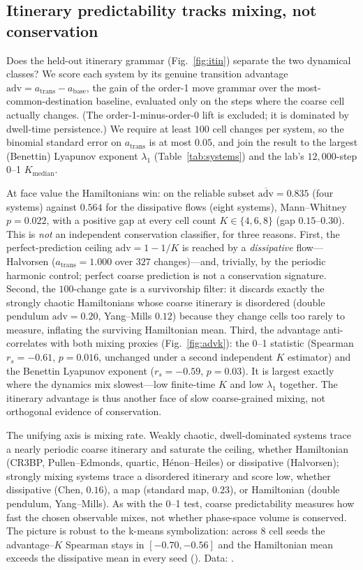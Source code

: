 \documentclass[aip,cha,preprint,amsmath,amssymb,floatfix]{revtex4-2}
\begin{document}
\subsection{Itinerary predictability tracks mixing, not conservation}
\label{sec:itin-adv}

Does the held-out itinerary grammar (Fig.~\ref{fig:itin}) separate the two
dynamical classes? We score each system by its genuine transition advantage
$\mathrm{adv}=a_{\mathrm{trans}}-a_{\mathrm{base}}$, the gain of the order-1 move
grammar over the most-common-destination baseline, evaluated only on the steps
where the coarse cell actually changes. (The order-1-minus-order-0 lift is
excluded; it is dominated by dwell-time persistence.) We require at least $100$
cell changes per system, so the binomial standard error on $a_{\mathrm{trans}}$
is at most $0.05$, and join the result to the largest (Benettin) Lyapunov
exponent $\lambda_1$ (Table~\ref{tab:systems}) and the lab's $12{,}000$-step
0--1 $K_{\mathrm{median}}$.

At face value the Hamiltonians win: on the reliable subset
$\overline{\mathrm{adv}}=0.835$ (four systems) against $0.564$ for the
dissipative flows (eight systems), Mann--Whitney $p=0.022$, with a positive gap
at every cell count $K\in\{4,6,8\}$ (gap $0.15$--$0.30$). This is \emph{not} an
independent conservation classifier, for three reasons. First, the
perfect-prediction ceiling $\mathrm{adv}=1-1/K$ is reached by a \emph{dissipative}
flow---Halvorsen ($a_{\mathrm{trans}}=1.000$ over $327$ changes)---and, trivially,
by the periodic harmonic control; perfect coarse prediction is not a conservation
signature. Second, the $100$-change gate is a survivorship filter: it discards
exactly the strongly chaotic Hamiltonians whose coarse itinerary is disordered
(double pendulum $\mathrm{adv}=0.20$, Yang--Mills $0.12$) because they change
cells too rarely to measure, inflating the surviving Hamiltonian mean. Third,
the advantage anti-correlates with both mixing proxies (Fig.~\ref{fig:advk}): the 0--1 statistic
(Spearman $r_s=-0.61$, $p=0.016$, unchanged under a second independent $K$
estimator) and the Benettin Lyapunov exponent ($r_s=-0.59$, $p=0.03$). It is
largest exactly where the dynamics mix slowest---low finite-time $K$ and low
$\lambda_1$ together. The itinerary advantage is thus another face of slow
coarse-grained mixing, not orthogonal evidence of conservation.

The unifying axis is mixing rate. Weakly chaotic, dwell-dominated systems trace a
nearly periodic coarse itinerary and saturate the ceiling, whether Hamiltonian
(CR3BP, Pullen--Edmonds, quartic, Hénon--Heiles) or dissipative (Halvorsen);
strongly mixing systems trace a disordered itinerary and score low, whether
dissipative (Chen, $0.16$), a map (standard map, $0.23$), or Hamiltonian (double
pendulum, Yang--Mills). As with the 0--1 test, coarse predictability measures how
fast the chosen observable mixes, not whether phase-space volume is conserved.
The picture is robust to the k-means symbolization: across $8$ cell seeds the
advantage--$K$ Spearman stays in $[-0.70,-0.56]$ and the Hamiltonian mean exceeds
the dissipative mean in every seed ().
Data: .
\end{document}
